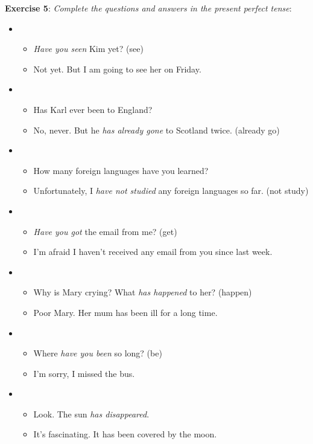 \textbf{Exercise 5}: \textit{Complete the  questions and answers in the present perfect tense}:

\begin{itemize}

\item
\begin{itemize}
\item \textit{Have you seen} Kim yet? (see)
\item Not yet. But I am going to see her on Friday.
\end{itemize}

\item
\begin{itemize}
\item Has Karl ever been to England?
\item No, never. But he \textit{has already gone} to Scotland twice. (already go)
\end{itemize}

\item
\begin{itemize}
\item How many foreign languages have you learned?
\item Unfortunately, I \textit{have not studied} any foreign languages so far. (not study)
\end{itemize}

\item
\begin{itemize}
\item \textit{Have you got} the email from me? (get)
\item I'm afraid I haven't received any email from you since last week.
\end{itemize}

\item
\begin{itemize}
\item Why is Mary crying? What \textit{has happened} to her? (happen)
\item Poor Mary. Her mum has been ill for a long time.
\end{itemize}

\item
\begin{itemize}
\item Where \textit{have you been} so long? (be)
\item I'm sorry, I missed the bus.
\end{itemize}

\item
\begin{itemize}
\item Look. The sun \textit{has disappeared}.
\item It's fascinating. It has been covered by the moon.
\end{itemize}


\end{itemize}
